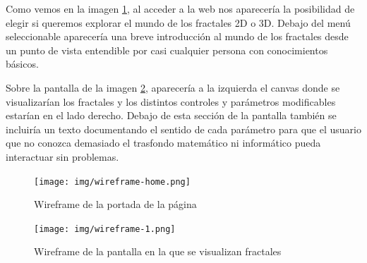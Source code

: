 Como vemos en la imagen \ref{fig:wireframe-home}, al acceder a la web nos aparecería la posibilidad de elegir si queremos explorar el mundo de los fractales 2D o 3D. Debajo del menú seleccionable aparecería una breve introducción al mundo de los fractales desde un punto de vista entendible por casi cualquier persona con conocimientos básicos.

Sobre la pantalla de la imagen \ref{fig:wireframe-fractals}, aparecería a la izquierda el canvas donde se visualizarían los fractales y los distintos controles y parámetros modificables estarían en el lado derecho. Debajo de esta sección de la pantalla también se incluiría un texto documentando el sentido de cada parámetro para que el usuario que no conozca demasiado el trasfondo matemático ni informático pueda interactuar sin problemas.

\newpage

\begin{figure} [ht]
    \centering
    \texttt{[image: img/wireframe-home.png]}
    \caption{Wireframe de la portada de la página}
    \label{fig:wireframe-home}
    \end{figure}

\begin{figure} [ht]
    \centering
    \texttt{[image: img/wireframe-1.png]}
    \caption{Wireframe de la pantalla en la que se visualizan fractales}
        \label{fig:wireframe-fractals}
    \end{figure}